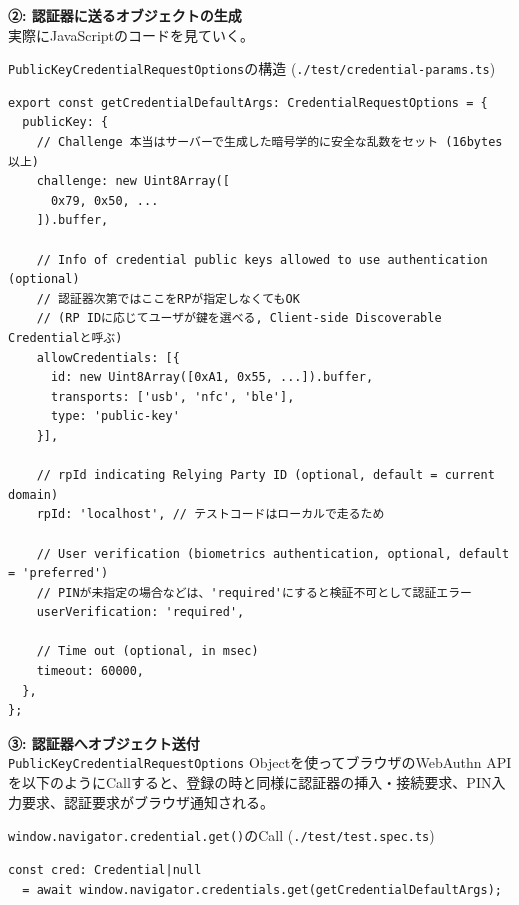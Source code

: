 \documentclass[12pt,dvipdfmx,uplatex]{beamer}
\begin{document}
\begin{frame}[fragile]
\textbf{②: 認証器に送るオブジェクトの生成}\\[2ex]
実際にJavaScriptのコードを見ていく。
\begin{exampleblock}{\scriptsize \texttt{PublicKeyCredentialRequestOptions}の構造 (\texttt{./test/credential-params.ts})}
\tiny
\begin{verbatim}
export const getCredentialDefaultArgs: CredentialRequestOptions = {
  publicKey: {
    // Challenge 本当はサーバーで生成した暗号学的に安全な乱数をセット (16bytes以上)
    challenge: new Uint8Array([
      0x79, 0x50, ...
    ]).buffer,

    // Info of credential public keys allowed to use authentication (optional)
    // 認証器次第ではここをRPが指定しなくてもOK
    // (RP IDに応じてユーザが鍵を選べる, Client-side Discoverable Credentialと呼ぶ)
    allowCredentials: [{
      id: new Uint8Array([0xA1, 0x55, ...]).buffer,
      transports: ['usb', 'nfc', 'ble'],
      type: 'public-key'
    }],

    // rpId indicating Relying Party ID (optional, default = current domain)
    rpId: 'localhost', // テストコードはローカルで走るため

    // User verification (biometrics authentication, optional, default = 'preferred')
    // PINが未指定の場合などは、'required'にすると検証不可として認証エラー
    userVerification: 'required',

    // Time out (optional, in msec)
    timeout: 60000,
  },
};
\end{verbatim}
\end{exampleblock}
 
\end{frame}

\begin{frame}[fragile]
\small
\textbf{③: 認証器へオブジェクト送付}\\[2ex]

\texttt{PublicKeyCredentialRequestOptions} Objectを使ってブラウザのWebAuthn APIを以下のようにCallすると、登録の時と同様に認証器の挿入・接続要求、\alert{PIN入力要求、認証要求がブラウザ通知}される。

\begin{exampleblock}{\scriptsize \texttt{window.navigator.credential.get()}のCall (\texttt{./test/test.spec.ts})}
{\scriptsize
\begin{verbatim}
const cred: Credential|null
  = await window.navigator.credentials.get(getCredentialDefaultArgs);
\end{verbatim}
}
\end{exampleblock}
\end{frame}
\end{document}
